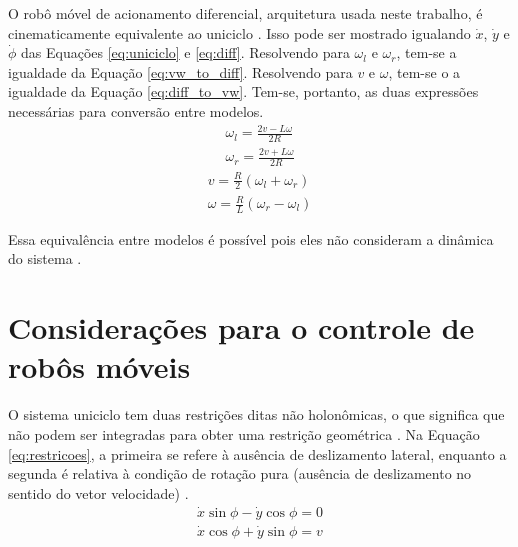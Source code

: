 O robô móvel de acionamento diferencial, arquitetura usada neste trabalho, é
cinematicamente equivalente ao uniciclo \cite{tese:franca}. Isso pode ser
mostrado igualando $\dot{x}$, $\dot{y}$ e $\dot{\phi}$ das Equações
\ref{eq:uniciclo} e \ref{eq:diff}. Resolvendo para $\omega_l$ e $\omega_r$,
tem-se a igualdade da Equação \ref{eq:vw_to_diff}. Resolvendo para $v$ e $\omega$,
tem-se o a igualdade da Equação \ref{eq:diff_to_vw}. Tem-se, portanto, as duas expressões
necessárias para conversão entre modelos.
\begin{equation}
	\label{eq:vw_to_diff}
	\begin{matrix}
	\omega_l = \frac{2v - L\omega}{2R} 
	\\
	\omega_r = \frac{2v + L\omega}{2R}
	\end{matrix}
\end{equation}
\begin{equation}
	\label{eq:diff_to_vw}
	\begin{matrix}
	v = \frac{R}{2} (\omega_l + \omega_r) 
	\\
	\omega = \frac{R}{L} (\omega_r - \omega_l)
	\end{matrix}
\end{equation}

Essa equivalência entre modelos é possível pois eles não consideram a dinâmica
do sistema \cite{lavalle2006planning}.

	
\section{Considerações para o controle de robôs móveis}

O sistema uniciclo tem duas restrições ditas não holonômicas, o que significa
que não podem ser integradas para obter uma restrição geométrica
\cite{Oriolo2013}.
Na Equação \ref{eq:restricoes}, a primeira se refere à ausência de deslizamento
lateral, enquanto a segunda é relativa à condição de rotação pura (ausência de
deslizamento no sentido do vetor velocidade) \cite[pg.
955]{book:AdvancedDynamics}.
\begin{equation}
	\label{eq:restricoes}
	\begin{matrix}
	\dot{x}\sin{\phi} - \dot{y}\cos{\phi} = 0 
	\\
	\dot{x}\cos{\phi} + \dot{y}\sin{\phi} = v
	\end{matrix}
\end{equation}

